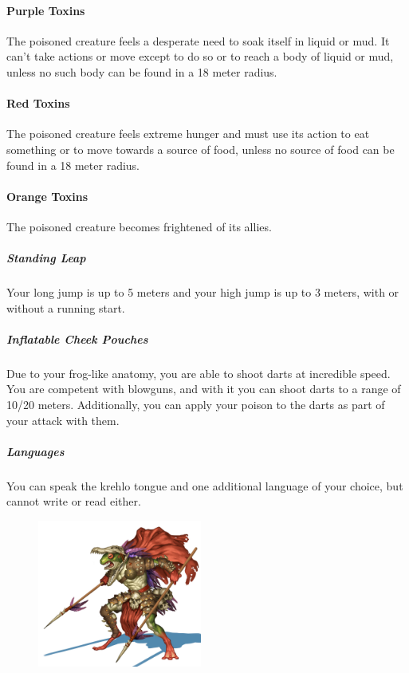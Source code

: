         \paragraph{Purple Toxins} The poisoned creature feels a desperate need to soak itself in liquid or mud.
        It can't take actions or move except to do so or to reach a body of liquid or mud, unless no such body can be found in a 18 meter radius.

        \paragraph{Red Toxins} The poisoned creature feels extreme hunger and must use its action to eat something or to move towards a source of food, unless no source of food can be found in a 18 meter radius.

        \paragraph{Orange Toxins} The poisoned creature becomes frightened of its allies.

    \subparagraph{Standing Leap} Your long jump is up to 5 meters and your high jump is up to 3 meters, with or without a running start.


    \subparagraph{Inflatable Cheek Pouches} Due to your frog-like anatomy, you are able to shoot darts at incredible speed.
    You are competent with blowguns, and with it you can shoot darts to a range of 10/20 meters.
    Additionally, you can apply your poison to the darts as part of your attack with them.


    \subparagraph{Languages} You can speak the krehlo tongue and one additional language of your choice, but cannot write or read either.

\begin{figure}[!b]
    \centering
    \includegraphics[width=0.48\textwidth]{04kins/img/18grung_warrior.jpg}
\end{figure}

\newpage
